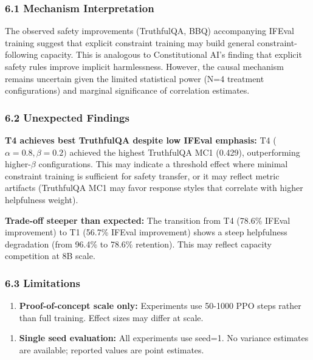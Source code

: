 
\subsubsection{6.1 Mechanism Interpretation}

The observed safety improvements (TruthfulQA, BBQ) accompanying IFEval training suggest that explicit constraint training may build general constraint-following capacity. This is analogous to Constitutional AI's finding that explicit safety rules improve implicit harmlessness. However, the causal mechanism remains uncertain given the limited statistical power (N=4 treatment configurations) and marginal significance of correlation estimates.

\subsubsection{6.2 Unexpected Findings}

\textbf{T4 achieves best TruthfulQA despite low IFEval emphasis:} T4 ($\alpha =0.8, \beta =0.2)$ achieved the highest TruthfulQA MC1 (0.429), outperforming higher-$\beta$ configurations. This may indicate a threshold effect where minimal constraint training is sufficient for safety transfer, or it may reflect metric artifacts (TruthfulQA MC1 may favor response styles that correlate with higher helpfulness weight).

\textbf{Trade-off steeper than expected:} The transition from T4 (78.6\% IFEval improvement) to T1 (56.7\% IFEval improvement) shows a steep helpfulness degradation (from 96.4\% to 78.6\% retention). This may reflect capacity competition at 8B scale.

\subsubsection{6.3 Limitations}

\begin{enumerate}
\item \textbf{Proof-of-concept scale only:} Experiments use 50-1000 PPO steps rather than full training. Effect sizes may differ at scale.
\end{enumerate}

\begin{enumerate}
\item \textbf{Single seed evaluation:} All experiments use seed=1. No variance estimates are available; reported values are point estimates.
\end{enumerate}

